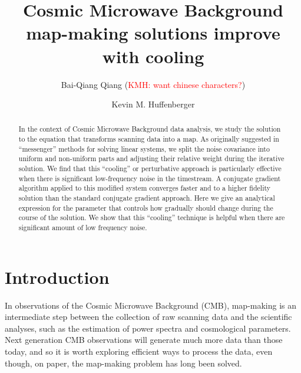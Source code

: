 \documentclass[twocolumn,linenumbers]{aastex631}
\newcommand{\kmh}[1]{\textcolor{red}{KMH: #1}}
\begin{document}
\title{Cosmic Microwave Background map-making solutions improve with cooling}


  \author{Bai-Qiang Qiang (\kmh{want chinese characters?})} %

\author[0000-0001-7109-0099]{Kevin M. Huffenberger}

 
\begin{abstract}

In the context of Cosmic Microwave Background data analysis, we study the solution to the equation that transforms scanning data into a map.
As originally suggested in ``messenger'' methods for solving linear systems, we split the  noise covariance into uniform and non-uniform parts and adjusting their relative weight during the iterative solution.
We find that this ``cooling'' or perturbative approach is particularly effective when there is significant low-frequency noise in the timestream.
A conjugate gradient algorithm applied to this modified system converges faster and to a higher fidelity solution than the standard conjugate gradient approach.%
Here we give an analytical expression for the parameter that controls how gradually should change during the course of the solution.
We show that this ``cooling'' technique is helpful when there are significant amount of low frequency noise.

\end{abstract}


\section{Introduction} \label{sec:intro}


In observations of the Cosmic Microwave Background (CMB), map-making is an intermediate step between the collection of raw scanning data and the scientific analyses, such as the estimation of power spectra and cosmological parameters.
Next generation CMB observations will generate much more data than those today, and so
it is worth exploring efficient ways to process the data, even though, on paper, the map-making problem has long been solved.
\end{document}
